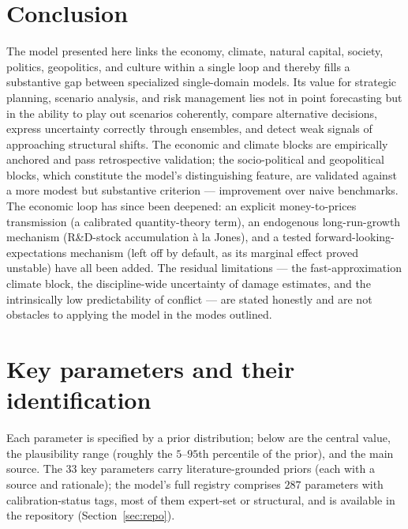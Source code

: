 \documentclass[11pt,a4paper]{article}
\begin{document}
\section{Conclusion}

The model presented here links the economy, climate, natural capital, society, politics, geopolitics,
and culture within a single loop and thereby fills a substantive gap between specialized
single-domain models. Its value for strategic planning, scenario analysis, and risk management lies
not in point forecasting but in the ability to play out scenarios coherently, compare alternative
decisions, express uncertainty correctly through ensembles, and detect weak signals of approaching
structural shifts. The economic and climate blocks are empirically anchored and pass retrospective
validation; the socio-political and geopolitical blocks, which constitute the model's distinguishing
feature, are validated against a more modest but substantive criterion --- improvement over naive
benchmarks. The economic loop has since been deepened: an explicit money-to-prices transmission (a calibrated
quantity-theory term), an endogenous long-run-growth mechanism (R\&D-stock accumulation à la Jones),
and a tested forward-looking-expectations mechanism (left off by default, as its marginal effect proved
unstable) have all been added. The residual limitations --- the fast-approximation climate block, the
discipline-wide uncertainty of damage estimates, and the intrinsically low predictability of conflict
--- are stated honestly and are not obstacles to applying the model in the modes outlined.

\clearpage
\appendix
\section{Key parameters and their identification}
\label{app:params}

Each parameter is specified by a prior distribution; below are the central value, the plausibility
range (roughly the $5$--$95$th percentile of the prior), and the main source. The $33$ key parameters carry
literature-grounded priors (each with a source and rationale); the model's full registry comprises
$287$ parameters with calibration-status tags, most of them expert-set or structural, and is
available in the repository (Section~\ref{sec:repo}).
\end{document}
